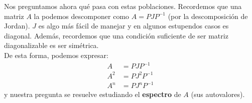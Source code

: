Nos preguntamos ahora qué pasa con estas poblaciones. Recordemos que una matriz $A$ la podemos descomponer como $A = P J P^{-1}$  (por la descomposición de Jordan). $J$ es algo más fácil de manejar y en algunos estupendos casos es diagonal.
Además, recordemos que una condición suficiente de ser matriz diagonalizable es ser simétrica.\\

De esta forma, podemos expresar:
\begin{align*}
    A &= P J P^{-1}\\
    A^2 &= P J^2 P^{-1}\\
    A^n &= P J^{n} P^{-1}
\end{align*}
y nuestra pregunta se resuelve estudiando el \textbf{espectro} de $A$ (sus autovalores).\\

